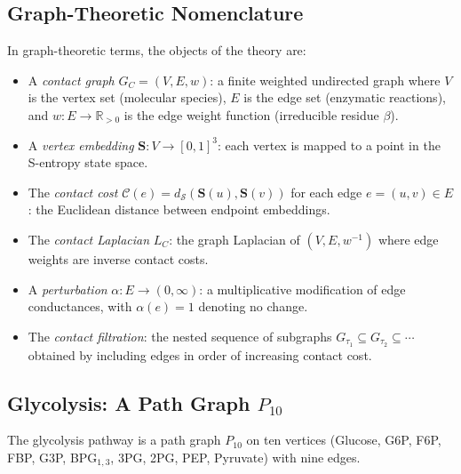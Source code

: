 \documentclass[11pt,twocolumn]{article}
\theoremstyle{plain}
\theoremstyle{definition}
\newcommand{\CC}{\mathcal{C}}
\newcommand{\bS}{\mathbf{S}}
\newcommand{\dS}{d_{\mathcal{S}}}
\newcommand{\reals}{\mathbb{R}}
\begin{document}
\subsection{Graph-Theoretic Nomenclature}

In graph-theoretic terms, the objects of the theory are:
\begin{itemize}
\item A \emph{contact graph} $G_C = (V, E, w)$: a finite weighted undirected
  graph where $V$ is the vertex set (molecular species), $E$ is the edge set
  (enzymatic reactions), and $w: E \to \reals_{>0}$ is the edge weight function
  (irreducible residue $\beta$).
\item A \emph{vertex embedding} $\bS: V \to [0,1]^3$: each vertex is mapped to
  a point in the S-entropy state space.
\item The \emph{contact cost} $\CC(e) = \dS(\bS(u), \bS(v))$ for each edge
  $e = (u,v) \in E$: the Euclidean distance between endpoint embeddings.
\item The \emph{contact Laplacian} $L_C$: the graph Laplacian of $(V, E,
  w^{-1})$ where edge weights are inverse contact costs.
\item A \emph{perturbation} $\alpha: E \to (0, \infty)$: a multiplicative
  modification of edge conductances, with $\alpha(e) = 1$ denoting no change.
\item The \emph{contact filtration}: the nested sequence of subgraphs
  $G_{\tau_1} \subseteq G_{\tau_2} \subseteq \cdots$ obtained by including
  edges in order of increasing contact cost.
\end{itemize}

\subsection{Glycolysis: A Path Graph $P_{10}$}
\label{sec:glycolysis}

The glycolysis pathway is a path graph $P_{10}$ on ten vertices (Glucose,
G6P, F6P, FBP, G3P, BPG$_{1,3}$, 3PG, 2PG, PEP, Pyruvate) with nine edges.
\end{document}
